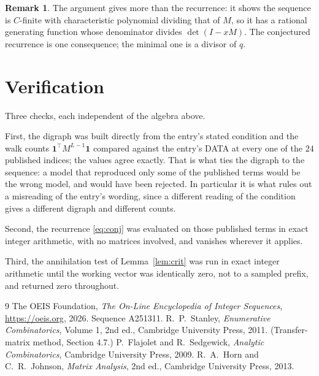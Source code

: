 \documentclass[11pt,a4paper]{article}
\theoremstyle{plain}
\theoremstyle{definition}
\newtheorem{remark}[theorem]{Remark}
\begin{document}
\begin{remark}
The argument gives more than the recurrence: it shows the sequence is $C$-finite with
characteristic polynomial dividing that of $M$, so it has a rational generating function
whose denominator divides $\det(I-xM)$. The conjectured recurrence is one consequence; the
minimal one is a divisor of $q$.
\end{remark}

\section{Verification}

Three checks, each independent of the algebra above.

First, the digraph was built directly from the entry's stated condition and the walk counts
$\mathbf{1}^{\!\top}M^{L-1}\mathbf{1}$ compared against the entry's DATA at
every one of the $24$ published indices; the values agree exactly. That is what ties
the digraph to the sequence: a model that reproduced only some of the published terms would
be the wrong model, and would have been rejected. In particular it is what rules out a
misreading of the entry's wording, since a different reading of the condition gives a
different digraph and different counts.

Second, the recurrence \eqref{eq:conj} was evaluated on those published terms in exact
integer arithmetic, with no matrices involved, and vanishes wherever it applies.

Third, the annihilation test of Lemma~\ref{lem:crit} was run in exact integer arithmetic
until the working vector was identically zero, not to a sampled prefix, and returned zero
throughout.

\begin{thebibliography}{9}
 The OEIS Foundation, \emph{The On-Line Encyclopedia of Integer
Sequences}, \url{https://oeis.org}, 2026. Sequence A251311.
 R.~P.~Stanley, \emph{Enumerative Combinatorics}, Volume 1, 2nd ed.,
Cambridge University Press, 2011. (Transfer-matrix method, Section 4.7.)
 P.~Flajolet and R.~Sedgewick, \emph{Analytic Combinatorics}, Cambridge
University Press, 2009.
 R.~A.~Horn and C.~R.~Johnson, \emph{Matrix Analysis}, 2nd ed., Cambridge
University Press, 2013.
\end{thebibliography}
\end{document}
